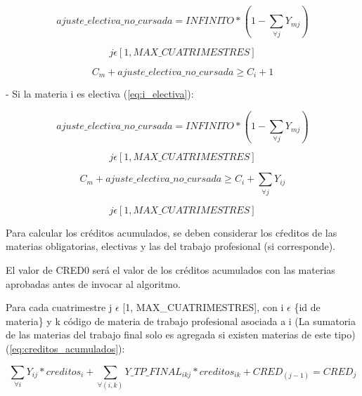 \documentclass[a4paper]{article}
\begin{document}
\begin{equation}
ajuste\_electiva\_no\_cursada = INFINITO * (1 - \sum_{\forall j} Y_{mj})
\end{equation}

\begin{equation}
j \epsilon [1, MAX\_CUATRIMESTRES]
\end{equation}

\begin{equation}\label{eq:i_obligatoria_m_obligatoria}
C_m + ajuste\_electiva\_no\_cursada \geq C_i + 1
\end{equation}

- Si la materia i es electiva (\ref{eq:i_electiva}):

\begin{equation}
ajuste\_electiva\_no\_cursada = INFINITO * (1 - \sum_{\forall j} Y_{mj})
\end{equation}

\begin{equation}
j \epsilon [1, MAX\_CUATRIMESTRES]
\end{equation}

\begin{equation}\label{eq:i_electiva}
C_m + ajuste\_electiva\_no\_cursada \geq C_i + \sum_{\forall j} Y_{ij}
\end{equation}

\begin{equation}
j \epsilon [1, MAX\_CUATRIMESTRES]
\end{equation}


Para calcular los créditos acumulados, se deben considerar los cŕeditos de las materias obligatorias, electivas y las del trabajo profesional (si corresponde).

El valor de CRED0 será el valor de los créditos acumulados con las materias aprobadas antes de invocar al algoritmo.\newline

Para cada cuatrimestre j $\epsilon$ [1, MAX\_CUATRIMESTRES], con i $\epsilon$ \{id de materia\} y k código de materia de trabajo profesional asociada a i (La sumatoria de las materias del trabajo final solo es agregada si existen materias de este tipo) (\ref{eq:creditos_acumulados}):

\begin{equation}\label{eq:creditos_acumulados}
\sum_{\forall i} Y_{ij} * creditos_i + \sum_{\forall (i,k)} Y\_TP\_FINAL_{ikj} * creditos_{ik} + CRED_{(j-1)} = CRED_j
\end{equation}
\end{document}
